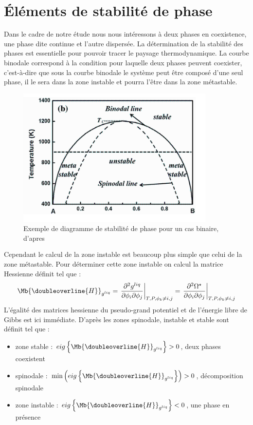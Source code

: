 \chapter{Éléments de stabilité de phase} \label{ann:stabphase}
Dans le cadre de notre étude nous nous intéressons à deux phases en coexistence, une phase dite continue et l'autre dispersée. La détermination de la stabilité des phases est essentielle pour pouvoir tracer le paysage thermodynamique. La courbe binodale correspond à la condition pour laquelle deux phases peuvent coexister, c'est-à-dire que sous la courbe binodale le système peut être composé d'une seul phase, il le sera dans la zone instable et pourra l'être dans la zone métastable.
\begin{figure}[h!]
	\centering
	\includegraphics[width=0.5\linewidth]{figure/metastable}
	\caption[Exemple de diagramme de stabilité de phase pour un cas binaire, d'apres]{Exemple de diagramme de stabilité de phase pour un cas binaire, d'apres}
	\label{fig:metastable}
\end{figure}
Cependant le calcul de la zone instable est beaucoup plus simple que celui de la zone métastable. Pour déterminer cette zone instable on calcul la matrice Hessienne définit tel que : 
\begin{equation}
	\Mb{\doubleoverline{H}}_{g^{liq}} = \left.\frac{\partial^2 g^{liq}}{\partial \phi_i \partial \phi_j}\right|_{T,P,\phi_k\neq i,j}
	=\left.\frac{\partial^2 \Omega^{\star}}{\partial \phi_i \partial \phi_j}\right|_{T,P,\phi_k\neq i,j}
\end{equation}
L'égalité des matrices hessienne du pseudo-grand potentiel et de l'énergie libre de Gibbs est ici immédiate. D'après \cite{aursand_spinodal_2017} les zones spinodale, instable et stable sont définit tel que :
\begin{itemize}
	\item zone stable : $\displaystyle eig\left\{\Mb{\doubleoverline{H}}_{g^{liq}} \right\} > 0$, deux phases coexistent \\ 
	\item spinodale : $\displaystyle \min \left( eig \left\{\Mb{\doubleoverline{H}}_{g^{liq}}\right\} \right) > 0$, décomposition spinodale \\
	\item zone instable : $\displaystyle eig\left\{\Mb{\doubleoverline{H}}_{g^{liq}} \right\} < 0$, une phase en présence \\ 
\end{itemize}
